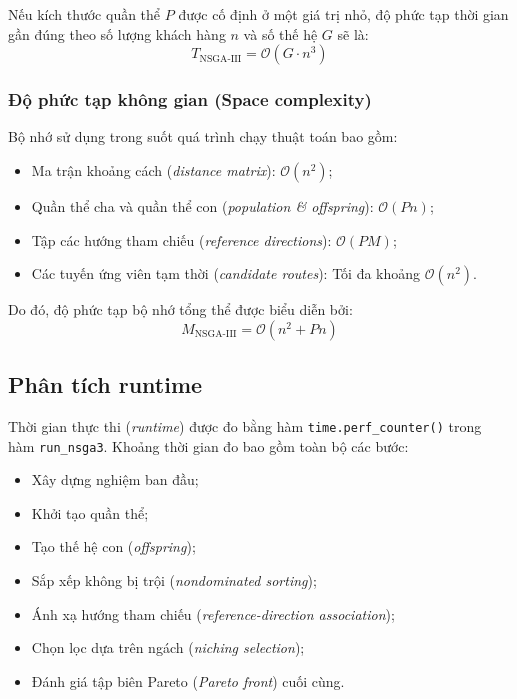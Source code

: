 \documentclass{article}
\begin{document}
Nếu kích thước quần thể $P$ được cố định ở một giá trị nhỏ, độ phức tạp thời gian gần đúng theo số lượng khách hàng $n$ và số thế hệ $G$ sẽ là:
\begin{equation}
    T_{\text{NSGA-III}} = \mathcal{O}(G \cdot n^3)
\end{equation}

\subsubsection{Độ phức tạp không gian (Space complexity)}
Bộ nhớ sử dụng trong suốt quá trình chạy thuật toán bao gồm:
\begin{itemize}
    \item Ma trận khoảng cách (\textit{distance matrix}): $\mathcal{O}(n^2)$;
    \item Quần thể cha và quần thể con (\textit{population \& offspring}): $\mathcal{O}(P n)$;
    \item Tập các hướng tham chiếu (\textit{reference directions}): $\mathcal{O}(P M)$;
    \item Các tuyến ứng viên tạm thời (\textit{candidate routes}): Tối đa khoảng $\mathcal{O}(n^2)$.
\end{itemize}

Do đó, độ phức tạp bộ nhớ tổng thể được biểu diễn bởi:
\begin{equation}
    M_{\text{NSGA-III}} = \mathcal{O}(n^2 + P n)
\end{equation}

\subsection{Phân tích runtime}

Thời gian thực thi (\textit{runtime}) được đo bằng hàm \texttt{time.perf\_counter()} trong hàm \texttt{run\_nsga3}. Khoảng thời gian đo bao gồm toàn bộ các bước:
\begin{itemize}
    \item Xây dựng nghiệm ban đầu;
    \item Khởi tạo quần thể;
    \item Tạo thế hệ con (\textit{offspring});
    \item Sắp xếp không bị trội (\textit{nondominated sorting});
    \item Ánh xạ hướng tham chiếu (\textit{reference-direction association});
    \item Chọn lọc dựa trên ngách (\textit{niching selection});
    \item Đánh giá tập biên Pareto (\textit{Pareto front}) cuối cùng.
\end{itemize}
\end{document}
